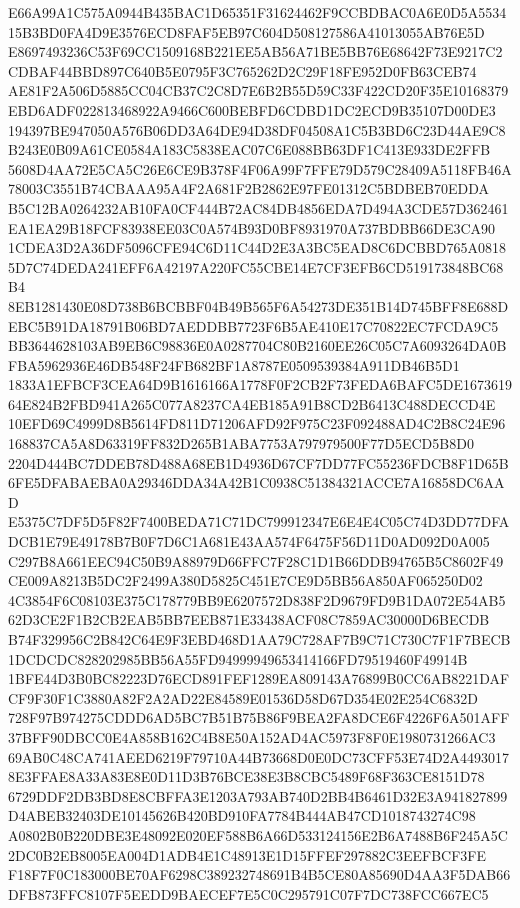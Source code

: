 \documentclass[UTF8,fontset=fandol,zihao=-4,a4paper]{ctexart}
\begin{document}
{{E66A99A1C575A0944B435BAC1D65351F31624462F9CCBDBAC0A6E0D5A553415B3BD0FA4D9E3576ECD8FAF5EB97C604D508127586A41013055AB76E5D
E8697493236C53F69CC1509168B221EE5AB56A71BE5BB76E68642F73E9217C2CDBAF44BBD897C640B5E0795F3C765262D2C29F18FE952D0FB63CEB74
AE81F2A506D5885CC04CB37C2C8D7E6B2B55D59C33F422CD20F35E10168379EBD6ADF022813468922A9466C600BEBFD6CDBD1DC2ECD9B35107D00DE3
194397BE947050A576B06DD3A64DE94D38DF04508A1C5B3BD6C23D44AE9C8B243E0B09A61CE0584A183C5838EAC07C6E088BB63DF1C413E933DE2FFB
5608D4AA72E5CA5C26E6CE9B378F4F06A99F7FFE79D579C28409A5118FB46A78003C3551B74CBAAA95A4F2A681F2B2862E97FE01312C5BDBEB70EDDA
B5C12BA0264232AB10FA0CF444B72AC84DB4856EDA7D494A3CDE57D362461EA1EA29B18FCF83938EE03C0A574B93D0BF8931970A737BDBB66DE3CA90
1CDEA3D2A36DF5096CFE94C6D11C44D2E3A3BC5EAD8C6DCBBD765A08185D7C74DEDA241EFF6A42197A220FC55CBE14E7CF3EFB6CD519173848BC68B4
8EB1281430E08D738B6BCBBF04B49B565F6A54273DE351B14D745BFF8E688DEBC5B91DA18791B06BD7AEDDBB7723F6B5AE410E17C70822EC7FCDA9C5
BB3644628103AB9EB6C98836E0A0287704C80B2160EE26C05C7A6093264DA0BFBA5962936E46DB548F24FB682BF1A8787E0509539384A911DB46B5D1
1833A1EFBCF3CEA64D9B1616166A1778F0F2CB2F73FEDA6BAFC5DE167361964E824B2FBD941A265C077A8237CA4EB185A91B8CD2B6413C488DECCD4E
10EFD69C4999D8B5614FD811D71206AFD92F975C23F092488AD4C2B8C24E96168837CA5A8D63319FF832D265B1ABA7753A797979500F77D5ECD5B8D0
2204D444BC7DDEB78D488A68EB1D4936D67CF7DD77FC55236FDCB8F1D65B6FE5DFABAEBA0A29346DDA34A42B1C0938C51384321ACCE7A16858DC6AAD
E5375C7DF5D5F82F7400BEDA71C71DC799912347E6E4E4C05C74D3DD77DFADCB1E79E49178B7B0F7D6C1A681E43AA574F6475F56D11D0AD092D0A005
C297B8A661EEC94C50B9A88979D66FFC7F28C1D1B66DDB94765B5C8602F49CE009A8213B5DC2F2499A380D5825C451E7CE9D5BB56A850AF065250D02
4C3854F6C08103E375C178779BB9E6207572D838F2D9679FD9B1DA072E54AB562D3CE2F1B2CB2EAB5BB7EEB871E33438ACF08C7859AC30000D6BECDB
B74F329956C2B842C64E9F3EBD468D1AA79C728AF7B9C71C730C7F1F7BECB1DCDCDC828202985BB56A55FD94999949653414166FD79519460F49914B
1BFE44D3B0BC82223D76ECD891FEF1289EA809143A76899B0CC6AB8221DAFCF9F30F1C3880A82F2A2AD22E84589E01536D58D67D354E02E254C6832D
728F97B974275CDDD6AD5BC7B51B75B86F9BEA2FA8DCE6F4226F6A501AFF37BFF90DBCC0E4A858B162C4B8E50A152AD4AC5973F8F0E1980731266AC3
69AB0C48CA741AEED6219F79710A44B73668D0E0DC73CFF53E74D2A44930178E3FFAE8A33A83E8E0D11D3B76BCE38E3B8CBC5489F68F363CE8151D78
6729DDF2DB3BD8E8CBFFA3E1203A793AB740D2BB4B6461D32E3A941827899D4ABEB32403DE10145626B420BD910FA7784B444AB47CD1018743274C98
A0802B0B220DBE3E48092E020EF588B6A66D533124156E2B6A7488B6F245A5C2DC0B2EB8005EA004D1ADB4E1C48913E1D15FFEF297882C3EEFBCF3FE
F18F7F0C183000BE70AF6298C389232748691B4B5CE80A85690D4AA3F5DAB66DFB873FFC8107F5EEDD9BAECEF7E5C0C295791C07F7DC738FCC667EC5
}}
\end{document}
